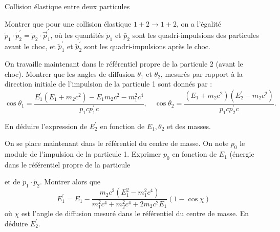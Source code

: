 \begin{exo}[PC][1][colle]{Collision élastique entre deux particules}
  \begin{quest}
    \item Montrer que pour une collision élastique $1+2 \rightarrow 1+2$, on a l'égalité $\tilde{p}_1 \cdot \tilde{p}_2^{\prime}=\tilde{p}_2 \cdot \vec{p}_1^{\prime}$, où les quantités $\tilde{p}_1$ et $\bar{p}_2$ sont les quadri-impulsions des particules avant le choc, et $\tilde{p}_1^{\prime}$ et $\tilde{p}_2^{\prime}$ sont les quadri-impulsions après le choc.
    \item On travaille maintenant dans le référentiel propre de la particule 2 (avant le choc). Montrer que les angles de diffusion $\theta_1$ et $\theta_2$, mesurés par rapport à la direction initiale de l'impulsion de la particule 1 sont donnés par :
    $$
    \cos \theta_1=\frac{E_1^{\prime}\left(E_1+m_2 c^2\right)-E_1 m_2 c^2-m_1^2 c^4}{p_1 c p_1^{\prime} c}, \quad \cos \theta_2=\frac{\left(E_1+m_2 c^2\right)\left(E_2^{\prime}-m_2 c^2\right)}{p_1 c p_2^{\prime} c} .
    $$
    
    En déduire l'expression de $E_2^{\prime}$ en fonction de $E_1, \theta_2$ et des masses.
    \item On se place maintenant dans le référentiel du centre de masse. On note $p_0$ le module de l'impulsion de la particule 1. Exprimer $p_0$ en fonction de $E_1$ (énergie dans le référentiel propre de la particule \item et de $\tilde{p}_1 \cdot \tilde{p}_2$. Montrer alors que
    $$
    E_1^{\prime}=E_1-\frac{m_2 c^2\left(E_1^2-m_1^2 c^4\right)}{m_1^2 c^4+m_2^2 c^4+2 m_2 c^2 E_1}(1-\cos \chi)
    $$
    où $\chi$ est l'angle de diffusion mesuré dans le référentiel du centre de masse. En déduire $E_2^{\prime}$.
  \end{quest}

\end{exo}

